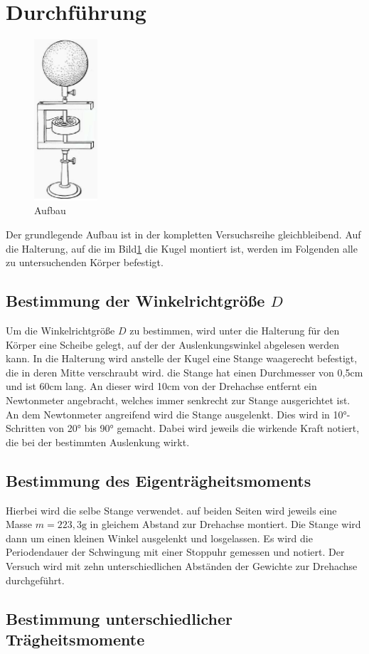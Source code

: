 \section{Durchführung}
\label{sec:Durchführung}

\begin{figure}
    \centering
    \includegraphics[height=6cm]{data/Bild_1}
    \caption{Aufbau}
    \label{fig:aufbau}
\end{figure}

Der grundlegende Aufbau ist in der kompletten Versuchsreihe gleichbleibend. Auf die Halterung, auf die im Bild\ref{fig:aufbau} die Kugel
montiert ist, werden im Folgenden alle zu untersuchenden Körper befestigt. 

\subsection{Bestimmung der Winkelrichtgröße $D$}

Um die Winkelrichtgröße $D$ zu bestimmen, wird unter die Halterung für den Körper eine Scheibe gelegt, auf der der Auslenkungswinkel 
abgelesen werden kann. In die Halterung wird anstelle der Kugel eine Stange waagerecht befestigt, die in deren Mitte verschraubt wird.
die Stange hat einen Durchmesser von 0,5$\si{\centi\meter}$ und ist 60$\si{\centi\meter}$ lang. An dieser wird 10$\si{\centi\meter}$
von der Drehachse entfernt ein Newtonmeter angebracht, welches immer senkrecht zur Stange ausgerichtet ist. An dem Newtonmeter 
angreifend wird die Stange ausgelenkt. Dies wird in 10$\si{\degree}$-Schritten von 20$\si{\degree}$ bis 90$\si{\degree}$ gemacht.
Dabei wird jeweils die wirkende Kraft notiert, die bei der bestimmten Auslenkung wirkt. 

\subsection{Bestimmung des Eigenträgheitsmoments}

Hierbei wird die selbe Stange verwendet. auf beiden Seiten wird jeweils eine Masse $m=223,3\si{\gram}$ in gleichem Abstand zur 
Drehachse montiert. Die Stange wird dann um einen kleinen Winkel ausgelenkt und losgelassen. Es wird die Periodendauer der Schwingung
mit einer Stoppuhr gemessen und notiert. Der Versuch wird mit zehn unterschiedlichen Abständen der Gewichte zur Drehachse durchgeführt.

\subsection{Bestimmung unterschiedlicher Trägheitsmomente}



